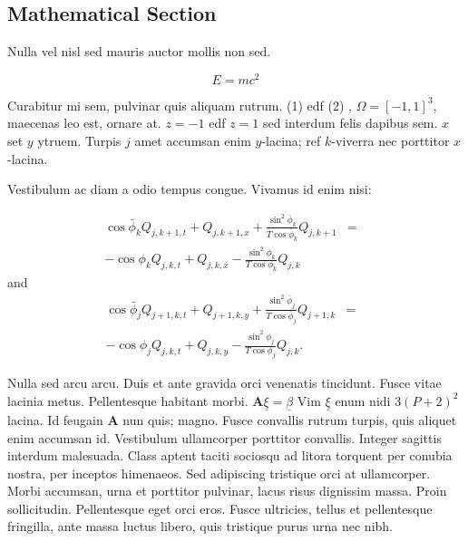 \documentclass[a0,landscape]{a0poster}
\begin{document}
\begin{multicols}{3}

\subsection*{Mathematical Section}

Nulla vel nisl sed mauris auctor mollis non sed.

\begin{equation}
E = mc^{2}
\label{eqn:Einstein}
\end{equation}

Curabitur mi sem, pulvinar quis aliquam rutrum. (1) edf (2)
, $\Omega=[-1,1]^3$, maecenas leo est, ornare at. $z=-1$ edf $z=1$ sed interdum felis dapibus sem. $x$ set $y$ ytruem.
Turpis $j$ amet accumsan enim $y$-lacina;
ref $k$-viverra nec porttitor $x$-lacina.

Vestibulum ac diam a odio tempus congue. Vivamus id enim nisi:

\begin{eqnarray}
\cos\bar{\phi}_k Q_{j,k+1,t} + Q_{j,k+1,x}+\frac{\sin^2\bar{\phi}_k}{T\cos\bar{\phi}_k} Q_{j,k+1} &=&\nonumber\\
-\cos\phi_k Q_{j,k,t} + Q_{j,k,x}-\frac{\sin^2\phi_k}{T\cos\phi_k} Q_{j,k}\label{edgek}
\end{eqnarray}
and
\begin{eqnarray}
\cos\bar{\phi}_j Q_{j+1,k,t} + Q_{j+1,k,y}+\frac{\sin^2\bar{\phi}_j}{T\cos\bar{\phi}_j} Q_{j+1,k}&=&\nonumber \\
-\cos\phi_j Q_{j,k,t} + Q_{j,k,y}-\frac{\sin^2\phi_j}{T\cos\phi_j} Q_{j,k}.\label{edgej}
\end{eqnarray}

Nulla sed arcu arcu. Duis et ante gravida orci venenatis tincidunt. Fusce vitae lacinia metus. Pellentesque habitant morbi. $\mathbf{A}\underline{\xi}=\underline{\beta}$ Vim $\underline{\xi}$ enum nidi $3(P+2)^{2}$ lacina. Id feugain $\mathbf{A}$ nun quis; magno. Fusce convallis rutrum turpis, quis aliquet enim accumsan id. Vestibulum ullamcorper porttitor convallis. Integer sagittis interdum malesuada. Class aptent taciti sociosqu ad litora torquent per conubia nostra, per inceptos himenaeos. Sed adipiscing tristique orci at ullamcorper. Morbi accumsan, urna et porttitor pulvinar, lacus risus dignissim massa. Proin sollicitudin. Pellentesque eget orci eros. Fusce ultricies, tellus et pellentesque fringilla, ante massa luctus libero, quis tristique purus urna nec nibh.



\end{multicols}
\end{document}
